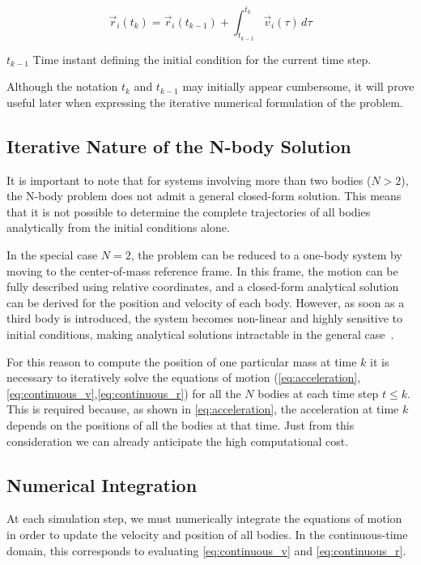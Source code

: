 \documentclass{article}
\begin{document}
\begin{equation}
\vec{r}_i(t_k) = \vec{r}_i(t_{k-1}) + \int_{t_{k-1}}^{t_k} \vec{v}_i(\tau)\, d\tau
\label{eq:continuous_r}
\end{equation}
\begin{description}
\item $t_{k-1}$ Time instant defining the initial condition for the current time step.
\end{description}
Although the notation $t_k$ and $t_{k-1}$ may initially appear cumbersome, it will prove useful later when expressing the iterative numerical formulation of the problem.
\subsection{Iterative Nature of the N-body Solution}
It is important to note that for systems involving more than two bodies (\( N > 2 \)), the N-body problem does not admit a general closed-form solution. This means that it is not possible to determine the complete trajectories of all bodies analytically from the initial conditions alone.

In the special case \( N = 2 \), the problem can be reduced to a one-body system by moving to the center-of-mass reference frame. In this frame, the motion can be fully described using relative coordinates, and a closed-form analytical solution can be derived for the position and velocity of each body. However, as soon as a third body is introduced, the system becomes non-linear and highly sensitive to initial conditions, making analytical solutions intractable in the general case~\cite{heggie2005classical}.

For this reason to compute the position of one particular mass at time $k$ it is necessary to iteratively solve the equations of motion (\eqref{eq:acceleration},\eqref{eq:continuous_v},\eqref{eq:continuous_r}) for all the $N$ bodies at each time step $t \leq k$. This is required because, as shown in \eqref{eq:acceleration}, the acceleration at time $k$ depends on the positions of all the bodies at that time.
Just from this consideration we can already anticipate the high computational cost.

\subsection{Numerical Integration}
At each simulation step, we must numerically integrate the equations of motion in order to update the velocity and position of all bodies. In the continuous-time domain, this corresponds to evaluating \eqref{eq:continuous_v} and \eqref{eq:continuous_r}.
\end{document}
